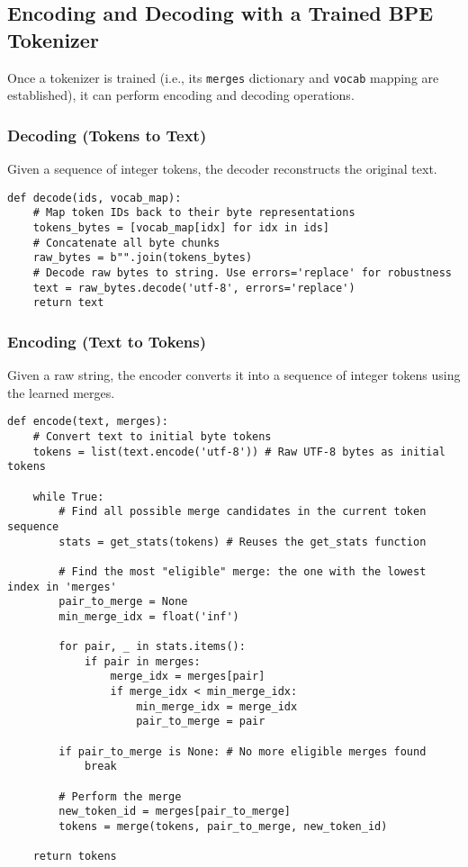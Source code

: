 \subsection{Encoding and Decoding with a Trained BPE Tokenizer}

Once a tokenizer is trained (i.e., its \texttt{merges} dictionary and \texttt{vocab} mapping are established), it can perform encoding and decoding operations.

\subsubsection{Decoding (Tokens to Text)}
Given a sequence of integer tokens, the decoder reconstructs the original text.

\begin{lstlisting}[caption={Decoding function}]
def decode(ids, vocab_map):
    # Map token IDs back to their byte representations
    tokens_bytes = [vocab_map[idx] for idx in ids]
    # Concatenate all byte chunks
    raw_bytes = b"".join(tokens_bytes)
    # Decode raw bytes to string. Use errors='replace' for robustness
    text = raw_bytes.decode('utf-8', errors='replace')
    return text
\end{lstlisting}

\subsubsection{Encoding (Text to Tokens)}
Given a raw string, the encoder converts it into a sequence of integer tokens using the learned merges.

\begin{lstlisting}[caption={Encoding function (simplified)}]
def encode(text, merges):
    # Convert text to initial byte tokens
    tokens = list(text.encode('utf-8')) # Raw UTF-8 bytes as initial tokens

    while True:
        # Find all possible merge candidates in the current token sequence
        stats = get_stats(tokens) # Reuses the get_stats function

        # Find the most "eligible" merge: the one with the lowest index in 'merges'
        pair_to_merge = None
        min_merge_idx = float('inf') 

        for pair, _ in stats.items(): 
            if pair in merges: 
                merge_idx = merges[pair] 
                if merge_idx < min_merge_idx:
                    min_merge_idx = merge_idx
                    pair_to_merge = pair

        if pair_to_merge is None: # No more eligible merges found
            break

        # Perform the merge
        new_token_id = merges[pair_to_merge]
        tokens = merge(tokens, pair_to_merge, new_token_id) 

    return tokens
\end{lstlisting}


